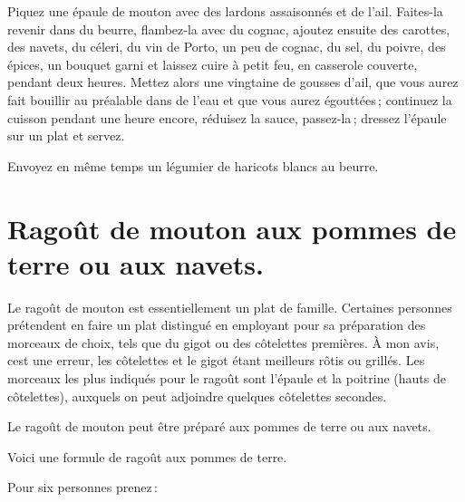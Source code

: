 Piquez une épaule de mouton avec des lardons assaisonnés et de l'ail. Faites-la
revenir dans du beurre, flambez-la avec du cognac, ajoutez ensuite des
carottes, des navets, du céleri, du vin de Porto, un peu de cognac, du sel, du
poivre, des épices, un bouquet garni et laissez cuire à petit feu, en casserole
couverte, pendant deux heures. Mettez alors une vingtaine de gousses d'ail, que
vous aurez fait bouillir au préalable dans de l'eau et que vous aurez
égouttées ; continuez la cuisson pendant une heure encore, réduisez la sauce,
passez-la ; dressez l'épaule sur un plat et servez.

Envoyez en même temps un légumier de haricots blancs au beurre.

\section*{\centering Ragoût de mouton aux pommes de terre ou aux navets.}
{}

Le ragoût de mouton est essentiellement un plat de famille. Certaines personnes
prétendent en faire un plat distingué en employant pour sa préparation des
morceaux de choix, tels que du gigot ou des côtelettes premières. À mon avis,
cest une erreur, les côtelettes et le gigot étant meilleurs rôtis ou grillés.
Les morceaux les plus indiqués pour le ragoût sont l'épaule et la poitrine
(hauts de côtelettes), auxquels on peut adjoindre quelques côtelettes secondes.

Le ragoût de mouton peut être préparé aux pommes de terre ou aux navets.

\medskip

Voici une formule de ragoût aux pommes de terre.

\medskip

Pour six personnes prenez :

\medskip

